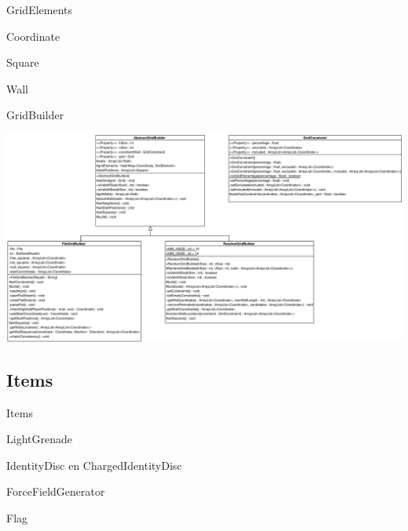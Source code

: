 \documentclass[11pt,t]{beamer}
\begin{document}
\begin{frame}{GridElements}
\end{frame}

\begin{frame}{Coordinate}
\end{frame}

\begin{frame}{Square}
\end{frame}

\begin{frame}{Wall}
\end{frame}

\begin{frame}{GridBuilder}
\begin{center}
\includegraphics[width=1\linewidth]{images/gridbuilder}
\end{center}
\end{frame}

\subsection{Items}

\begin{frame}{Items}
\end{frame}

\begin{frame}{LightGrenade}
\end{frame}

\begin{frame}{IdentityDisc en ChargedIdentityDisc}
\end{frame}

\begin{frame}{ForceFieldGenerator}
\end{frame}

\begin{frame}{Flag}
\end{frame}
\end{document}
